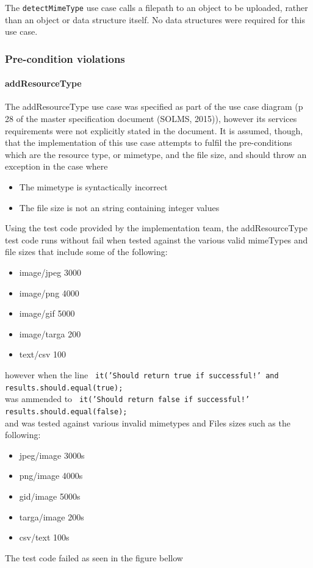 \documentclass[a4paper]{article}
\begin{document}
The \texttt{detectMimeType} use case calls a filepath to an object to be uploaded, rather than an object or data structure itself. No data structures were required for this use case.


\subsubsection {Pre-condition violations}

\paragraph{addResourceType}The addResourceType use case was specified as part of the use case diagram (p 28 of the master specification document (SOLMS, 2015)), however its services requirements were not explicitly stated in the document. It is assumed, though, that the implementation of this use case attempts to fulfil the pre-conditions which are the resource type, or mimetype, and the file size, and should throw an exception in the case where
\begin{itemize}
\item The mimetype is syntactically incorrect
\item The file size is not an string containing integer values
\end{itemize}
Using the test code provided by the implementation team, the addResourceType test code runs without fail when tested against the various valid mimeTypes and file sizes that include some of the following:
\begin{itemize}
\item image/jpeg  3000
\item image/png   4000
\item image/gif   5000
\item image/targa 200
\item text/csv    100
\end{itemize}

however when the line \texttt{ it('Should return true if successful!' and  results.should.equal(true);}\\
was ammended to \texttt{ it('Should return false if successful!'  results.should.equal(false);}\\
and was tested against various invalid mimetypes and Files sizes such as the following:
\begin{itemize}
\item jpeg/image  3000s
\item png/image   4000s
\item gid/image   5000s
\item targa/image 200s
\item csv/text    100s
\end{itemize}
The test code failed as seen in the figure bellow
\end{document}
